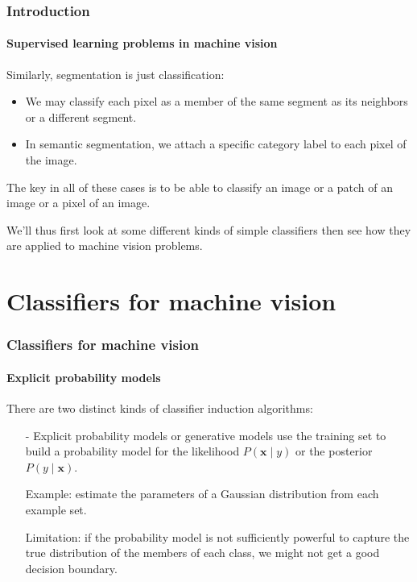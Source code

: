 \documentclass[aspectratio=169]{beamer}
\renewcommand{\vec}[1]{\boldsymbol{#1}}
\begin{document}
\begin{frame}
\frametitle{Introduction}
\framesubtitle{Supervised learning problems in machine vision}

Similarly, \alert{segmentation is just classification}:
\begin{itemize}
\item We may classify each \alert{pixel} as a member of the same
  segment as its neighbors or a different segment.
\item In \alert{semantic segmentation}, we attach a specific
  \alert{category label} to each pixel of the image.
\end{itemize}
  
\medskip

The key in all of these cases is to be able to classify an image or a
patch of an image or a pixel of an image.

\medskip

We'll thus first look at some different kinds of simple classifiers
then see how they are applied to machine vision problems.

\end{frame}

\section{Classifiers for machine vision}

\begin{frame}
\frametitle{Classifiers for machine vision}
\framesubtitle{Explicit probability models}

There are two distinct kinds of classifier induction algorithms:

\medskip

\begin{itemize}
\item[-] \alert{Explicit probability models} or \alert{generative
  models} use the training set to build a probability model for the
  likelihood $P(\vec{x} \mid y)$ or the posterior $P(y \mid \vec{x})$.

  \smallskip
  Example: estimate the parameters of a Gaussian distribution from
  each example set.

  \smallskip
  Limitation: if the probability model is not sufficiently powerful to
  capture the true distribution of the members of each class, we might
  not get a good decision boundary.

\end{itemize}

\end{frame}
\end{document}
